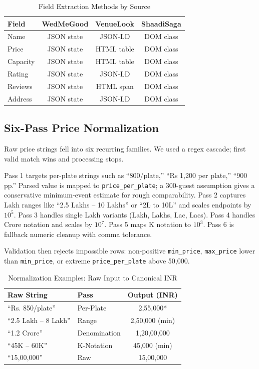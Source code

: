 \documentclass[conference]{IEEEtran}
\begin{document}
\begin{table}[htbp]
\caption{Field Extraction Methods by Source}
\begin{center}
\begin{tabular}{|l|c|c|c|}
\hline
\textbf{Field} & \textbf{WedMeGood} & \textbf{VenueLook} & \textbf{ShaadiSaga} \\
\hline
Name & JSON state & JSON-LD & DOM class \\
\hline
Price & JSON state & HTML table & DOM class \\
\hline
Capacity & JSON state & HTML table & DOM class \\
\hline
Rating & JSON state & JSON-LD & DOM class \\
\hline
Reviews & JSON state & HTML span & DOM class \\
\hline
Address & JSON state & JSON-LD & DOM class \\
\hline
\end{tabular}
\label{tab:extraction}
\end{center}
\end{table}

\subsection{Six-Pass Price Normalization}

Raw price strings fell into six recurring families. We used a regex cascade; first valid match wins and processing stops.

Pass 1 targets per-plate strings such as ``800/plate,'' ``Rs 1,200 per plate,'' ``900 pp.'' Parsed value is mapped to \texttt{price\_per\_plate}; a 300-guest assumption gives a conservative minimum-event estimate for rough comparability. Pass 2 captures Lakh ranges like ``2.5 Lakhs -- 10 Lakhs'' or ``2L to 10L'' and scales endpoints by $10^5$. Pass 3 handles single Lakh variants (Lakh, Lakhs, Lac, Lacs). Pass 4 handles Crore notation and scales by $10^7$. Pass 5 maps K notation to $10^3$. Pass 6 is fallback numeric cleanup with comma tolerance.

Validation then rejects impossible rows: non-positive \texttt{min\_price}, \texttt{max\_price} lower than \texttt{min\_price}, or extreme \texttt{price\_per\_plate} above 50,000.

\begin{table}[htbp]
\caption{Normalization Examples: Raw Input to Canonical INR}
\begin{center}
\begin{tabular}{|l|l|c|}
\hline
\textbf{Raw String} & \textbf{Pass} & \textbf{Output (INR)} \\
\hline
``Rs. 850/plate'' & Per-Plate & 2,55,000* \\
\hline
``2.5 Lakh -- 8 Lakh'' & Range & 2,50,000 (min) \\
\hline
``1.2 Crore'' & Denomination & 1,20,00,000 \\
\hline
``45K -- 60K'' & K-Notation & 45,000 (min) \\
\hline
``15,00,000'' & Raw & 15,00,000 \\
\hline
\end{tabular}
\label{tab:norm}
\end{center}
\end{table}
\end{document}
